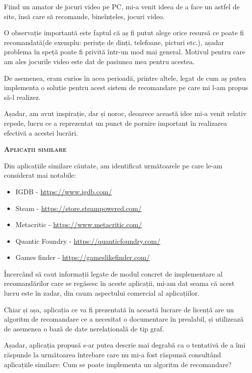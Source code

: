 \documentclass[12pt,a4paper]{report}
\begin{document}
	Fiind un amator de jocuri video pe PC, mi-a venit ideea de a face un astfel de site, însă care să recomande, bineînțeles, jocuri video.
	
	O observație importantă este faptul că aș fi putut alege orice resursă ce poate fi recomandată(de exemplu: periuțe de dinți, telefoane, picturi etc.), așadar problema în speță poate fi privită într-un mod mai general. Motivul pentru care am ales jocurile video este dat de pasiunea mea pentru acestea.
	
	De asemenea, eram curios în acea perioadă, printre altele, legat de cum aș putea implementa o soluție pentru acest sistem de recomandare pe care mi l-am propus să-l realizez.
	
	Așadar, am avut inspirație, dar și noroc, deoarece această idee mi-a venit relativ repede, lucru ce a reprezentat un punct de pornire important în realizarea efectivă a acestei lucrări.
	
	\newpage
	
	\begin{center}
	{\scshape\large \textbf{Aplicații similare} \par}
	\end{center}
	
	Din aplicațiile similare căutate, am identificat următoarele pe care le-am considerat mai notabile:
	
\begin{itemize}
  \item IGDB - \url{https://www.igdb.com/}
  \item Steam - \url{https://store.steampowered.com/}
  \item Metacritic - \url{https://www.metacritic.com/}
  \item Quantic Foundry - \url{https://quanticfoundry.com/}
  \item Games finder - \url{https://gameslikefinder.com/}
\end{itemize}


Încercând să caut informații legate de modul concret de implementare al recomandărilor care se regăsesc în aceste aplicații, mi-am dat seama că acest lucru este în zadar, din cauza aspectului comercial al aplicațiilor.

Chiar și așa, aplicația ce va fi prezentată în această lucrare de licență are un algoritm de recomandare ce a necesitat o documentare în prealabil, și utilizează de asemenea o bază de date nerelațională de tip graf.

Așadar, aplicația propusă s-ar putea descrie mai degrabă ca o tentativă de a îmi răspunde la următoarea întrebare care nu mi-a fost răspunsă consultând aplicațiile similare: Cum se poate implementa un algoritm de recomandare?
\end{document}

